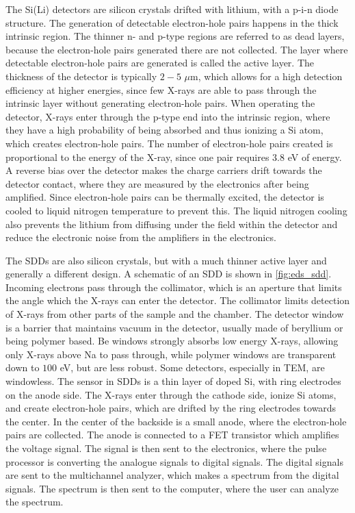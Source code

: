 The Si(Li) detectors are silicon crystals drifted with lithium, with a p-i-n diode structure.
The generation of detectable electron-hole pairs happens in the thick intrinsic region.
The thinner n- and p-type regions are referred to as dead layers, because the electron-hole pairs generated there are not collected.
The layer where detectable electron-hole pairs are generated is called the active layer.
The thickness of the detector is typically $2-5$ $\mu$m, which allows for a high detection efficiency at higher energies, since few X-rays are able to pass through the intrinsic layer without generating electron-hole pairs.
When operating the detector, X-rays enter through the p-type end into the intrinsic region, where they have a high probability of being absorbed and thus ionizing a Si atom, which creates electron-hole pairs.
The number of electron-hole pairs created is proportional to the energy of the X-ray, since one pair requires $3.8$ eV of energy.
A reverse bias over the detector makes the charge carriers drift towards the detector contact, where they are measured by the electronics after being amplified.
Since electron-hole pairs can be thermally excited, the detector is cooled to liquid nitrogen temperature to prevent this.
The liquid nitrogen cooling also prevents the lithium from diffusing under the field within the detector and reduce the electronic noise from the amplifiers in the electronics.

The SDDs are also silicon crystals, but with a much thinner active layer and generally a different design.
A schematic of an SDD is shown in \cref{fig:eds_sdd}.
Incoming electrons pass through the collimator, which is an aperture that limits the angle which the X-rays can enter the detector.
The collimator limits detection of X-rays from other parts of the sample and the chamber.
The detector window is a barrier that maintains vacuum in the detector, usually made of beryllium or being polymer based.
Be windows strongly absorbs low energy X-rays, allowing only X-rays above Na to pass through, while polymer windows are transparent down to $100$ eV, but are less robust.
Some detectors, especially in TEM, are windowless.
The sensor in SDDs is a thin layer of doped Si, with ring electrodes on the anode side.
The X-rays enter through the cathode side, ionize Si atoms, and create electron-hole pairs, which are drifted by the ring electrodes towards the center.
In the center of the backside is a small anode, where the electron-hole pairs are collected.
The anode is connected to a FET transistor which amplifies the voltage signal.
The signal is then sent to the electronics, where the pulse processor is converting the analogue signals to digital signals.
The digital signals are sent to the multichannel analyzer, which makes a spectrum from the digital signals.
The spectrum is then sent to the computer, where the user can analyze the spectrum.


